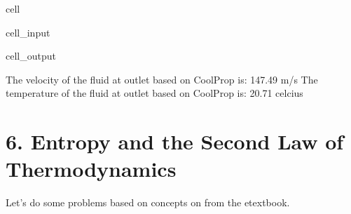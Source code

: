 \documentclass[letterpaper,10pt,english]{jupyterBook}
\begin{document}
\begin{sphinxuseclass}{cell}
\begin{sphinxVerbatimInput}
\begin{sphinxuseclass}{cell_input}
\begin{sphinxVerbatim}[commandchars=\\\{\}]
  
  
\end{sphinxVerbatim}

\end{sphinxuseclass}\end{sphinxVerbatimInput}
\begin{sphinxVerbatimOutput}

\begin{sphinxuseclass}{cell_output}
\begin{sphinxVerbatim}[commandchars=\\\{\}]
The velocity of the fluid at outlet based on CoolProp is: 147.49 m/s
The temperature of the fluid at outlet based on CoolProp is: \PYGZhy{}20.71 celcius
\end{sphinxVerbatim}

\end{sphinxuseclass}\end{sphinxVerbatimOutput}

\end{sphinxuseclass}
\sphinxstepscope


\chapter{6. Entropy and the Second Law of Thermodynamics}
\label{\detokenize{notebooks/Chapter6/chapter6:entropy-and-the-second-law-of-thermodynamics}}\label{\detokenize{notebooks/Chapter6/chapter6::doc}}
\sphinxAtStartPar
Let’s do some problems based on concepts on  from the e\sphinxhyphen{}textbook.

\sphinxstepscope
\end{document}
